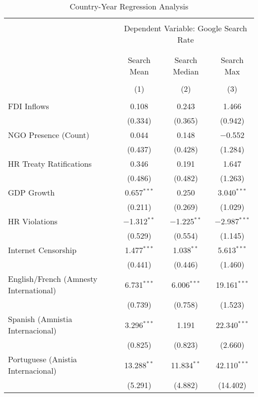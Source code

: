 
\begin{table}[!htbp] \centering 
  \caption{Country-Year Regression Analysis} 
  \label{} 
\begin{tabular}{@{\extracolsep{5pt}}lccc} 
\\[-1.8ex]\hline 
\hline \\[-1.8ex] 
 & \multicolumn{3}{c}{Dependent Variable: Google Search Rate} \\ 
\cline{2-4} 
\\[-1.8ex] & \multicolumn{3}{c}{ } \\ 
 & Search Mean & Search Median & Search Max \\ 
\\[-1.8ex] & (1) & (2) & (3)\\ 
\hline \\[-1.8ex] 
 FDI Inflows & 0.108 & 0.243 & 1.466 \\ 
  & (0.334) & (0.365) & (0.942) \\ 
  NGO Presence (Count) & 0.044 & 0.148 & $-$0.552 \\ 
  & (0.437) & (0.428) & (1.284) \\ 
  HR Treaty Ratifications & 0.346 & 0.191 & 1.647 \\ 
  & (0.486) & (0.482) & (1.263) \\ 
  GDP Growth & 0.657$^{***}$ & 0.250 & 3.040$^{***}$ \\ 
  & (0.211) & (0.269) & (1.029) \\ 
  HR Violations & $-$1.312$^{**}$ & $-$1.225$^{**}$ & $-$2.987$^{***}$ \\ 
  & (0.529) & (0.554) & (1.145) \\ 
  Internet Censorship & 1.477$^{***}$ & 1.038$^{**}$ & 5.613$^{***}$ \\ 
  & (0.441) & (0.446) & (1.460) \\ 
  English/French (Amnesty International) & 6.731$^{***}$ & 6.006$^{***}$ & 19.161$^{***}$ \\ 
  & (0.739) & (0.758) & (1.523) \\ 
  Spanish (Amnistia Internacional) & 3.296$^{***}$ & 1.191 & 22.340$^{***}$ \\ 
  & (0.825) & (0.823) & (2.660) \\ 
  Portuguese (Anistia Internacional) & 13.288$^{**}$ & 11.834$^{**}$ & 42.110$^{***}$ \\ 
  & (5.291) & (4.882) & (14.402) \\ 

\end{tabular}
\end{table}
